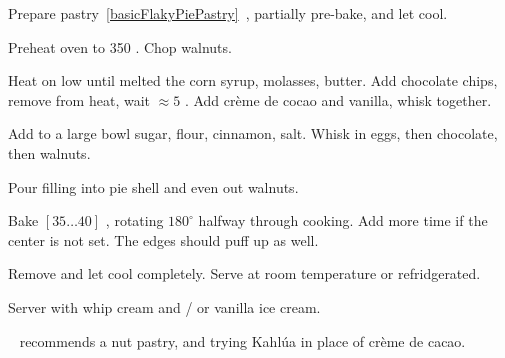 \begin{preparation}
\item Prepare pastry~\ref{basicFlakyPiePastry}~,
    partially pre-bake, and let cool.

\item Preheat oven to 350 \Fahrenheit.
    Chop walnuts.

\item Heat on low until melted the corn syrup, molasses, butter.
    Add chocolate chips, remove from heat, wait $\approx 5$ \minute.
    Add cr\`{e}me de cocao and vanilla, whisk together.

\item Add to a large bowl sugar, flour, cinnamon, salt.
    Whisk in eggs, then chocolate, then walnuts.

\item Pour filling into pie shell and even out walnuts.

\item Bake $[35 \dots 40]$ \minute, rotating $180^\circ$ halfway through cooking.
    Add more time if the center is not set.
    The edges should puff up as well.

\item Remove and let cool completely.
    Serve at room temperature or refridgerated.
\end{preparation}

\begin{variation}
\item Server with whip cream and / or vanilla ice cream.

\item \citeauthor{pie2004}~\cite{pie2004} recommends a nut pastry, and trying
    Kahl\'{u}a in place of cr\`{e}me de cacao.
\end{variation}

\recipeend%
